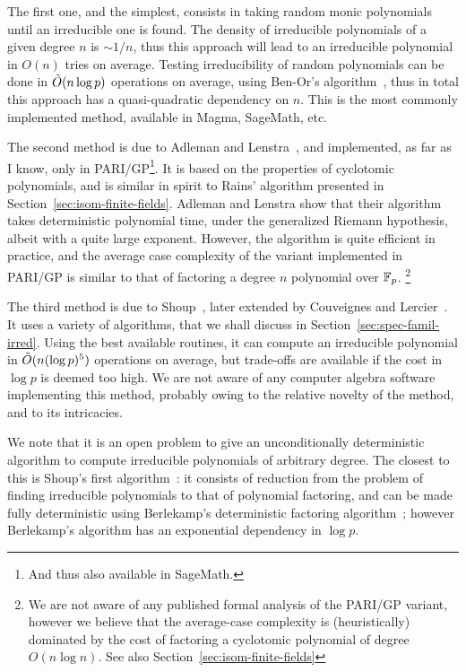 \documentclass[b5layout]{hdr}
\begin{document}
The first one, and the simplest, consists in taking random monic
polynomials until an irreducible one is found. %
The density of irreducible polynomials of a given degree $n$ is
$\sim 1/n$, thus this approach will lead to an irreducible polynomial
in $O(n)$ tries on average. %
Testing irreducibility of random polynomials can be done in
$\tilde{O}(n\log p)$ operations on average, using Ben-Or's
algorithm~\cite{Ben-Or1981,10.1007/978-3-642-60539-0_27}, thus in
total this approach has a quasi-quadratic dependency on $n$. %
This is the most commonly implemented method, available in Magma,
SageMath, etc.

The second method is due to Adleman and
Lenstra~\cite{Adleman-Lenstra}, and implemented, as far as I know,
only in PARI/GP\footnote{And thus also available in SageMath.}. %
It is based on the properties of cyclotomic polynomials, and is
similar in spirit to Rains' algorithm presented in
Section~\ref{sec:isom-finite-fields}. %
Adleman and Lenstra show that their algorithm takes deterministic
polynomial time, under the generalized Riemann hypothesis, albeit with
a quite large exponent. %
However, the algorithm is quite efficient in practice, and the average
case complexity of the variant implemented in PARI/GP is similar to
that of factoring a degree $n$ polynomial over $\mathbb{F}_p$.%
\footnote{We are not aware of any published formal analysis of the
  PARI/GP variant, however we believe that the average-case complexity
  is (heuristically) dominated by the cost of factoring a cyclotomic
  polynomial of degree $O(n\log n)$. %
  See also Section~\ref{sec:isom-finite-fields}} %

The third method is due to Shoup~\cite{Shoup_1990,shoup93,shoup94},
later extended by Couveignes and
Lercier~\cite{couveignes+lercier11,DeDoSc13}. %
It uses a variety of algorithms, that we shall discuss in
Section~\ref{sec:spec-famil-irred}. %
Using the best available routines, it can compute an irreducible
polynomial in $\tilde{O}(n(\log p)^5)$ operations on average, but
trade-offs are available if the cost in $\log p$ is deemed too high. %
We are not aware of any computer algebra software implementing this
method, probably owing to the relative novelty of the method, and to
its intricacies. %

We note that it is an open problem to give an unconditionally
deterministic algorithm to compute irreducible polynomials of
arbitrary degree. %
The closest to this is Shoup's first algorithm~\cite{Shoup_1990}: it
consists of reduction from the problem of finding irreducible
polynomials to that of polynomial factoring, and can be made fully
deterministic using Berlekamp's deterministic factoring
algorithm~\cite{berlekamp1970factoring}; however Berlekamp's algorithm
has an exponential dependency in $\log p$.
\end{document}
